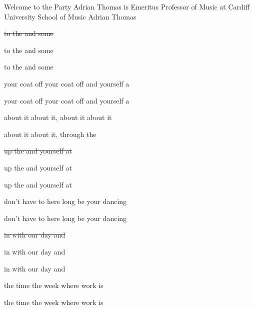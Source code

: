 \begin{SBSong}{Welcome to the Party}
  {Adrian Thomas is Emeritus Professor of Music at Cardiff University School of Music}
  {Adrian Thomas}
  \begin{SBVerse}
    \sout{ to the  and   some  }
	
     to the  and   some  
	
     to the  and   some  
	
     your coat off  your coat off and  yourself a 

     your coat off  your coat off and  yourself a 
  \end{SBVerse}
  \begin{SBChorus}
     about it  about it,  about it  about it

     about it  about it,  through the 
  \end{SBChorus}
  \begin{SBVerse}
    \sout{ up the  and  yourself at }

     up the  and  yourself at 

     up the  and  yourself at 

     don't have to  here long be your dancing 

     don't have to  here long be your dancing 
  \end{SBVerse}
  \begin{SBVerse}
    \sout{ in with our   day and }
    
     in with our   day and 
    
     in with our   day and 

     the time  the week where  work is 

     the time  the week where  work is 
  \end{SBVerse}
\end{SBSong}